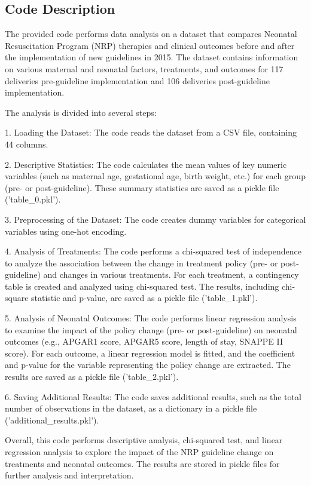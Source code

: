 \documentclass[11pt]{article}
\begin{document}
\subsection{Code Description}

The provided code performs data analysis on a dataset that compares Neonatal Resuscitation Program (NRP) therapies and clinical outcomes before and after the implementation of new guidelines in 2015. The dataset contains information on various maternal and neonatal factors, treatments, and outcomes for 117 deliveries pre-guideline implementation and 106 deliveries post-guideline implementation.

The analysis is divided into several steps:

1. Loading the Dataset: The code reads the dataset from a CSV file, containing 44 columns.

2. Descriptive Statistics: The code calculates the mean values of key numeric variables (such as maternal age, gestational age, birth weight, etc.) for each group (pre- or post-guideline). These summary statistics are saved as a pickle file ('table\_0.pkl').

3. Preprocessing of the Dataset: The code creates dummy variables for categorical variables using one-hot encoding.

4. Analysis of Treatments: The code performs a chi-squared test of independence to analyze the association between the change in treatment policy (pre- or post-guideline) and changes in various treatments. For each treatment, a contingency table is created and analyzed using chi-squared test. The results, including chi-square statistic and p-value, are saved as a pickle file ('table\_1.pkl').

5. Analysis of Neonatal Outcomes: The code performs linear regression analysis to examine the impact of the policy change (pre- or post-guideline) on neonatal outcomes (e.g., APGAR1 score, APGAR5 score, length of stay, SNAPPE II score). For each outcome, a linear regression model is fitted, and the coefficient and p-value for the variable representing the policy change are extracted. The results are saved as a pickle file ('table\_2.pkl').

6. Saving Additional Results: The code saves additional results, such as the total number of observations in the dataset, as a dictionary in a pickle file ('additional\_results.pkl').

Overall, this code performs descriptive analysis, chi-squared test, and linear regression analysis to explore the impact of the NRP guideline change on treatments and neonatal outcomes. The results are stored in pickle files for further analysis and interpretation.
\end{document}
